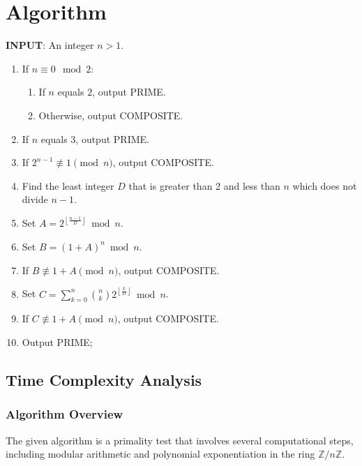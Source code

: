 \documentclass{article}
\theoremstyle{plain}
\theoremstyle{definition}
\begin{document}
\section{Algorithm}
\textbf{INPUT}: An integer $n > 1$.
\begin{center}
    \begin{enumerate}
        \item If $n \equiv 0 \mod{2}$:
            \begin{enumerate}
                \item If $n$ equals $2$, output PRIME.
                \item Otherwise, output COMPOSITE.
            \end{enumerate}
        \item If $n$ equals $3$, output PRIME.
        \item If $2^{n-1} \not\equiv 1 \pmod{n}$, output COMPOSITE.
        \item Find the least integer $D$ that is greater than 2 and less than $n$ which does not divide $n-1$.
        \item Set $A = 2^{\left\lfloor \frac{n-1}{D} \right\rfloor} \bmod{n}$.
        \item Set $B = (1 + A)^n \bmod{n}$.
        \item If $B \not\equiv 1 + A \pmod{n}$, output COMPOSITE.
        \item Set $C = \sum_{k=0}^{n} \binom{n}{k} 2^{\left\lfloor \frac{k}{D} \right\rfloor} \bmod{n}$.
        \item If $C \not\equiv 1 + A \pmod{n}$, output COMPOSITE.
        \item Output PRIME;
    \end{enumerate}
\end{center}

\subsection{Time Complexity Analysis}

\subsubsection{Algorithm Overview}
The given algorithm is a primality test that involves several computational steps, including modular arithmetic and polynomial exponentiation in the ring \(\mathbb{Z}/n\mathbb{Z}\).
\end{document}
